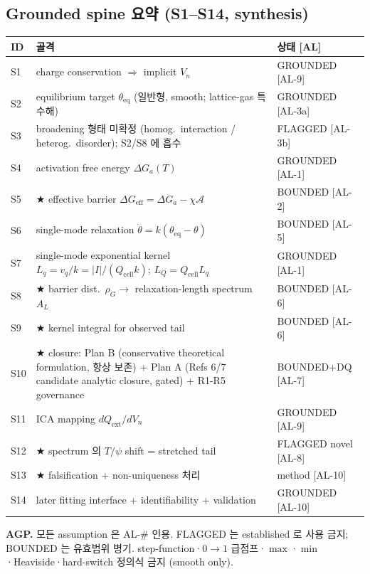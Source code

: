 \documentclass[11pt,a4paper]{article}
\newcommand{\eff}{\mathrm{eff}}
\newcommand{\eq}{\mathrm{eq}}
\newcommand{\cell}{\mathrm{cell}}
\newcommand{\ext}{\mathrm{ext}}
\newcommand{\AL}[1]{\textsf{[AL-#1]}}
\begin{document}
\subsection{Grounded spine 요약 (S1--S14, synthesis)}\label{sec:spine}
\begin{longtable}{p{} p{} p{}}
\toprule ID & 골격 & 상태 [AL] \\ \midrule \endhead
S1 & charge conservation $\Rightarrow$ implicit $V_n$ & GROUNDED \AL{9} \\
S2 & equilibrium target $\theta_\eq$ (일반형, smooth; lattice-gas 특수해) & GROUNDED \AL{3a} \\
S3 & broadening 형태 미확정 (homog.\ interaction / heterog.\ disorder); S2/S8 에 흡수 & FLAGGED \AL{3b} \\
S4 & activation free energy $\Delta G_a(T)$ & GROUNDED \AL{1} \\
S5 & ★ effective barrier $\Delta G_\eff=\Delta G_a-\chi\mathcal A$ & BOUNDED \AL{2} \\
S6 & single-mode relaxation $\dot\theta=k(\theta_\eq-\theta)$ & BOUNDED \AL{5} \\
S7 & single-mode exponential kernel $L_q=v_q/k=|I|/(Q_\cell k)$; $L_Q=Q_\cell L_q$ & GROUNDED \AL{1} \\
S8 & ★ barrier dist.\ $\rho_G\to$ relaxation-length spectrum $A_L$ & BOUNDED \AL{6} \\
S9 & ★ kernel integral for observed tail & BOUNDED \AL{6} \\
S10 & ★ closure: Plan B (conservative theoretical formulation, 항상 보존) + Plan A (Refs 6/7 candidate analytic closure, gated) + R1-R5 governance & BOUNDED+DQ \AL{7} \\
S11 & ICA mapping $dQ_\ext/dV_n$ & GROUNDED \AL{9} \\
S12 & ★ spectrum 의 $T/\psi$ shift = stretched tail & FLAGGED novel \AL{8} \\
S13 & ★ falsification + non-uniqueness 처리 & method \AL{10} \\
S14 & later fitting interface + identifiability + validation & GROUNDED \AL{10} \\
\bottomrule
\end{longtable}
\textbf{AGP.} 모든 assumption 은 AL-\# 인용. FLAGGED 는 established 로 사용 금지; BOUNDED
는 유효범위 병기. step-function·$0\!\to\!1$ 급점프·$\max$·$\min$·Heaviside·hard-switch
정의식 금지 (smooth only).
\end{document}
